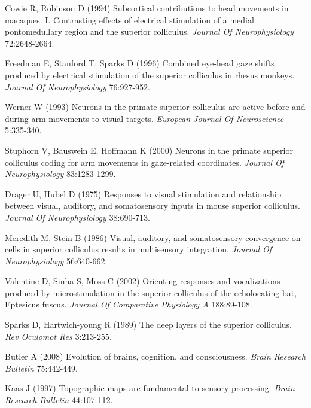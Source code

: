 \documentclass{ar-1col}
\begin{document}
{\begin{thebibliography}{00}
Cowie R, Robinson D (1994) 
Subcortical contributions to head movements in macaques. I. Contrasting effects of electrical stimulation of a medial pontomedullary region and the superior colliculus.
\textit{ Journal Of Neurophysiology} 72:2648-2664.

Freedman E, Stanford T, Sparks D (1996) 
Combined eye-head gaze shifts produced by electrical stimulation of the superior colliculus in rhesus monkeys.
\textit{ Journal Of Neurophysiology} 76:927-952.

Werner W (1993) 
Neurons in the primate superior colliculus are active before and during arm movements to visual targets.
\textit{ European Journal Of Neuroscience} 5:335-340.

Stuphorn V, Bauswein E, Hoffmann K (2000) 
Neurons in the primate superior colliculus coding for arm movements in gaze-related coordinates.
\textit{ Journal Of Neurophysiology} 83:1283-1299.

Drager U, Hubel D (1975) 
Responses to visual stimulation and relationship between visual, auditory, and somatosensory inputs in mouse superior colliculus.
\textit{ Journal Of Neurophysiology} 38:690-713.

Meredith M, Stein B (1986) 
Visual, auditory, and somatosensory convergence on cells in superior colliculus results in multisensory integration.
\textit{ Journal Of Neurophysiology} 56:640-662.

Valentine D, Sinha S, Moss C (2002) 
Orienting responses and vocalizations produced by microstimulation in the superior colliculus of the echolocating bat, Eptesicus fuscus.
\textit{ Journal Of Comparative Physiology A} 188:89-108.

Sparks D, Hartwich-young R (1989) 
The deep layers of the superior colliculus.
\textit{ Rev Oculomot Res} 3:213-255.

Butler A (2008) 
Evolution of brains, cognition, and consciousness.
\textit{ Brain Research Bulletin} 75:442-449.

Kaas J (1997) 
Topographic maps are fundamental to sensory processing.
\textit{ Brain Research Bulletin} 44:107-112.


\end{thebibliography}}
\end{document}
